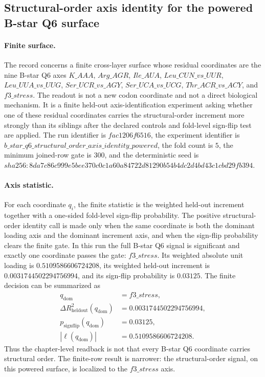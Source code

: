 \subsection{Structural-order axis identity for the powered B-star Q6 surface}\label{subsec:h3-cross-layer-relation-structural-order-axis-identity-b-star-q6-powered}

\paragraph{Finite surface.}
The record concerns a finite cross-layer surface whose residual coordinates are the nine B-star Q6 axes
$K\_AAA$, $Arg\_AGR$, $Ile\_AUA$, $Leu\_CUN\_vs\_UUR$, $Leu\_UUA\_vs\_UUG$, $Ser\_UCR\_vs\_AGY$, $Ser\_UCA\_vs\_UCG$, $Thr\_ACR\_vs\_ACY$, and $f3\_stress$.
The readout is not a new codon coordinate and not a direct biological mechanism.  It is a finite held-out axis-identification experiment asking whether one of these residual coordinates carries the structural-order increment more strongly than its siblings after the declared controls and fold-level sign-flip test are applied.  The run identifier is $fac1206f6516$, the experiment identifier is $b\_star\_q6\_structural\_order\_axis\_identity\_powered$, the fold count is $5$, the minimum joined-row gate is $300$, and the deterministic seed is $sha256:8da7c86c999e5bee370c0c1a60a84722d81290b54b4dc2d4bd43c1cbd29fb394$.

\paragraph{Axis statistic.}
For each coordinate $q_i$, the finite statistic is the weighted held-out increment together with a one-sided fold-level sign-flip probability.  The positive structural-order identity call is made only when the same coordinate is both the dominant loading axis and the dominant increment axis, and when the sign-flip probability clears the finite gate.  In this run the full B-star Q6 signal is significant and exactly one coordinate passes the gate: $f3\_stress$.  Its weighted absolute unit loading is $0.5109586606724208$, its weighted held-out increment is $0.0031744502294756994$, and its sign-flip probability is $0.03125$.  The finite decision can be summarized as
$$
\begin{aligned}
q_{\mathrm{dom}} &= f3\_stress,\\
\Delta R^2_{\mathrm{heldout}}(q_{\mathrm{dom}}) &= 0.0031744502294756994,\\
p_{\mathrm{signflip}}(q_{\mathrm{dom}}) &= 0.03125,\\
|\ell(q_{\mathrm{dom}})| &= 0.5109586606724208.
\end{aligned}
$$
Thus the chapter-level readback is not that every B-star Q6 coordinate carries structural order.  The finite-row result is narrower: the structural-order signal, on this powered surface, is localized to the $f3\_stress$ axis.

